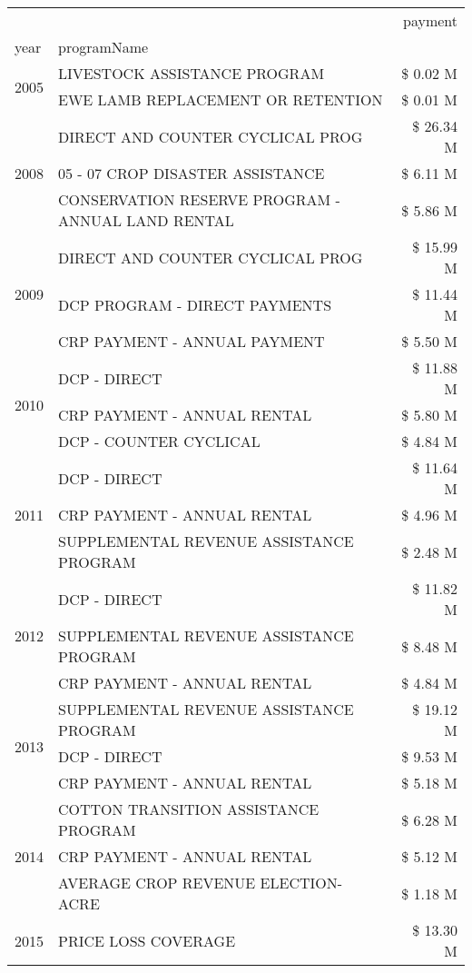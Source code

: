 \begin{tabular}{llr}
\toprule
 &  & payment \\
year & programName &  \\
\midrule
\multirow[t]{2}{*}{2005} & LIVESTOCK ASSISTANCE PROGRAM & \$ 0.02 M \\
 & EWE LAMB REPLACEMENT OR RETENTION & \$ 0.01 M \\
\cline{1-3}
\multirow[t]{3}{*}{2008} & DIRECT AND COUNTER CYCLICAL PROG & \$ 26.34 M \\
 & 05 - 07 CROP DISASTER ASSISTANCE & \$ 6.11 M \\
 & CONSERVATION RESERVE PROGRAM - ANNUAL LAND RENTAL & \$ 5.86 M \\
\cline{1-3}
\multirow[t]{3}{*}{2009} & DIRECT AND COUNTER CYCLICAL PROG & \$ 15.99 M \\
 & DCP PROGRAM - DIRECT PAYMENTS & \$ 11.44 M \\
 & CRP PAYMENT - ANNUAL PAYMENT & \$ 5.50 M \\
\cline{1-3}
\multirow[t]{3}{*}{2010} & DCP - DIRECT & \$ 11.88 M \\
 & CRP PAYMENT - ANNUAL RENTAL & \$ 5.80 M \\
 & DCP - COUNTER CYCLICAL & \$ 4.84 M \\
\cline{1-3}
\multirow[t]{3}{*}{2011} & DCP - DIRECT & \$ 11.64 M \\
 & CRP PAYMENT - ANNUAL RENTAL & \$ 4.96 M \\
 & SUPPLEMENTAL REVENUE ASSISTANCE PROGRAM & \$ 2.48 M \\
\cline{1-3}
\multirow[t]{3}{*}{2012} & DCP - DIRECT & \$ 11.82 M \\
 & SUPPLEMENTAL REVENUE ASSISTANCE PROGRAM & \$ 8.48 M \\
 & CRP PAYMENT - ANNUAL RENTAL & \$ 4.84 M \\
\cline{1-3}
\multirow[t]{3}{*}{2013} & SUPPLEMENTAL REVENUE ASSISTANCE PROGRAM & \$ 19.12 M \\
 & DCP - DIRECT & \$ 9.53 M \\
 & CRP PAYMENT - ANNUAL RENTAL & \$ 5.18 M \\
\cline{1-3}
\multirow[t]{3}{*}{2014} & COTTON TRANSITION ASSISTANCE PROGRAM & \$ 6.28 M \\
 & CRP PAYMENT - ANNUAL RENTAL & \$ 5.12 M \\
 & AVERAGE CROP REVENUE ELECTION-ACRE & \$ 1.18 M \\
\cline{1-3}
\multirow[t]{3}{*}{2015} & PRICE LOSS COVERAGE & \$ 13.30 M \\

\end{tabular}
